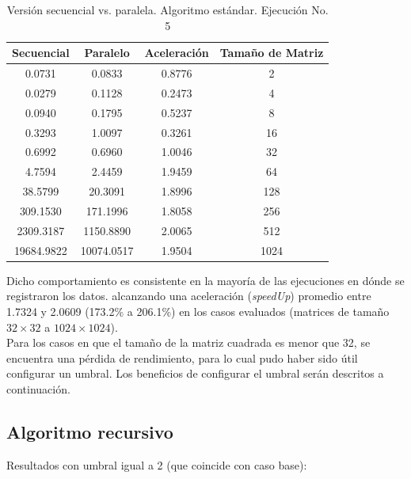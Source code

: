 \documentclass{article}
\begin{document}
\begin{table}[ht]
\centering
\begin{tabular}{|c|c|c|c|}
\hline
\textbf{Secuencial} & \textbf{Paralelo} & \textbf{Aceleración} & \textbf{Tamaño de Matriz} \\
\hline
0.0731 & 0.0833 & 0.8776 & 2 \\
0.0279 & 0.1128 & 0.2473 & 4 \\
0.0940 & 0.1795 & 0.5237 & 8 \\
0.3293 & 1.0097 & 0.3261 & 16 \\
0.6992 & 0.6960 & 1.0046 & 32 \\
4.7594 & 2.4459 & 1.9459 & 64 \\
38.5799 & 20.3091 & 1.8996 & 128 \\
309.1530 & 171.1996 & 1.8058 & 256 \\
2309.3187 & 1150.8890 & 2.0065 & 512 \\
19684.9822 & 10074.0517 & 1.9504 & 1024 \\
\hline
\end{tabular}
\caption{Versión secuencial vs. paralela. Algoritmo estándar. Ejecución No. 5}
\end{table}

Dicho comportamiento es consistente en la mayoría de las ejecuciones en dónde se registraron los datos. alcanzando una aceleración (\textit{speedUp}) promedio entre 1.7324 y 2.0609 (173.2\% a 206.1\%) en los casos evaluados (matrices de tamaño \(32 \times 32\) a \(1024 \times 1024\)). \\

Para los casos en que el tamaño de la matriz cuadrada es menor que 32, se encuentra una pérdida de rendimiento, para lo cual pudo haber sido útil configurar un umbral. Los beneficios de configurar el umbral serán descritos a continuación.

\clearpage

\subsection{Algoritmo recursivo}

Resultados con umbral igual a 2 (que coincide con caso base):
\end{document}

